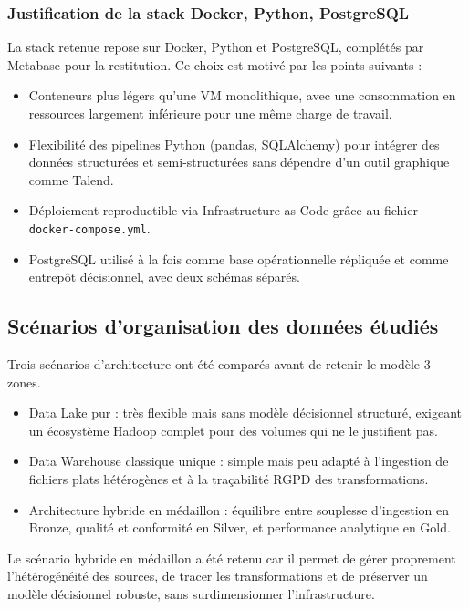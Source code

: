 \documentclass[12pt, a4paper]{report}
\begin{document}
\subsubsection{Justification de la stack Docker, Python, PostgreSQL}

La stack retenue repose sur Docker, Python et PostgreSQL, complétés par Metabase pour la restitution. Ce choix est motivé par les points suivants : 

\begin{itemize}[label=\textcolor{chuBlue}{\textbullet}]
  \item Conteneurs plus légers qu'une VM monolithique, avec une consommation en ressources largement inférieure pour une même charge de travail.
  \item Flexibilité des pipelines Python (pandas, SQLAlchemy) pour intégrer des données structurées et semi-structurées sans dépendre d'un outil graphique comme Talend.
  \item Déploiement reproductible via Infrastructure as Code grâce au fichier \texttt{docker-compose.yml}.
  \item PostgreSQL utilisé à la fois comme base opérationnelle répliquée et comme entrepôt décisionnel, avec deux schémas séparés.
\end{itemize}

\subsection{Scénarios d'organisation des données étudiés}

Trois scénarios d'architecture ont été comparés avant de retenir le modèle 3 zones.

\begin{itemize}[label=\textcolor{chuBlue}{\textbullet}]
  \item Data Lake pur : très flexible mais sans modèle décisionnel structuré, exigeant un écosystème Hadoop complet pour des volumes qui ne le justifient pas.
  \item Data Warehouse classique unique : simple mais peu adapté à l'ingestion de fichiers plats hétérogènes et à la traçabilité RGPD des transformations.
  \item Architecture hybride en médaillon : équilibre entre souplesse d'ingestion en Bronze, qualité et conformité en Silver, et performance analytique en Gold.
\end{itemize}

\begin{infobox}
Le scénario hybride en médaillon a été retenu car il permet de gérer proprement l'hétérogénéité des sources, de tracer les transformations et de préserver un modèle décisionnel robuste, sans surdimensionner l'infrastructure.
\end{infobox}
\end{document}

